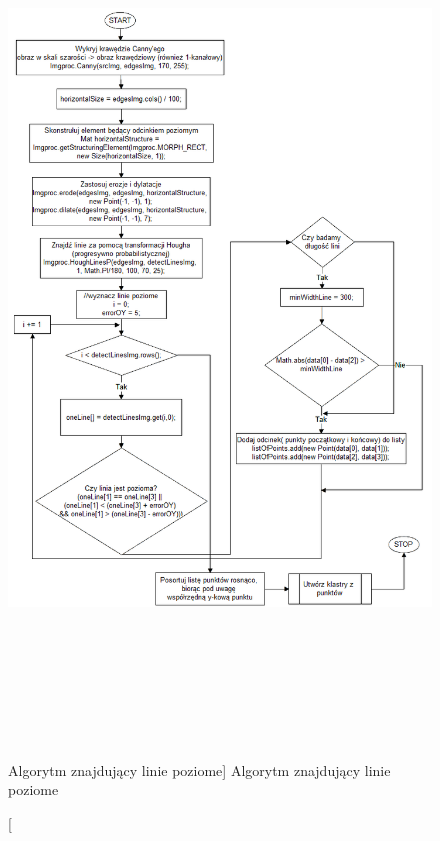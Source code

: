 \documentclass[a4paper,12pt]{article}
\begin{document}
    			\begin{figure}[!ht]  
    		        \begin{center}
    		    	    \includegraphics[height=23cm]{image//algorithm//prepareImgToAnalize.png} 
    			    \end{center}
    		    	\caption
        	    		[Algorytm znajdujący linie poziome]  
            			{Algorytm znajdujący linie poziome}  
            			\label{fig:searchHorizontalLine}
    		    \end{figure}	
				
\end{document}
